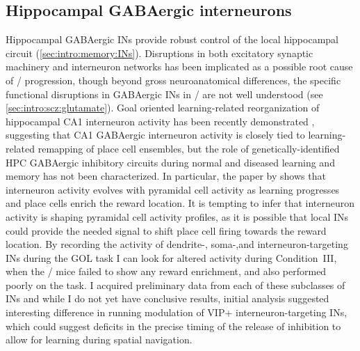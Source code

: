 \subsection{Hippocampal GABAergic interneurons}
Hippocampal GABAergic \ac{INs} provide robust control of the local hippocampal circuit (\autoref{sec:intro:memory:INs}).
Disruptions in both excitatory synaptic machinery and interneuron networks has been implicated as a possible root cause of \scz/ progression, though beyond gross neuroanatomical differences, the specific functional disruptions in GABAergic \ac{INs} in \scz/ are not well understood (see \autoref{sec:intro:scz:glutamate}).
Goal oriented learning-related reorganization of hippocampal CA1 interneuron activity has been recently demonstrated \citep{Dupret2013}, suggesting that CA1 GABAergic interneuron activity is closely tied to learning-related remapping of place cell ensembles, but the role of genetically-identified \ac{HPC} GABAergic inhibitory circuits during normal and diseased learning and memory has not been characterized.
In particular, the paper by \citeauthor{Dupret2013} shows that interneuron activity evolves with pyramidal cell activity as learning progresses and place cells enrich the reward location.
It is tempting to infer that interneuron activity is shaping pyramidal cell activity profiles, as it is possible that local \ac{INs} could provide the needed signal to shift place cell firing towards the reward location.
By recording the activity of dendrite-, soma-,and interneuron-targeting \ac{INs} during the \ac{GOL} task I can look for altered activity during Condition~III, when the \df/ mice failed to show any reward enrichment, and also performed poorly on the task.
I acquired preliminary data from each of these subclasses of \ac{INs} and while I do not yet have conclusive results, initial analysis suggested interesting difference in running modulation of VIP+ interneuron-targeting \ac{INs}, which could suggest deficits in the precise timing of the release of inhibition to allow for learning during spatial navigation.

